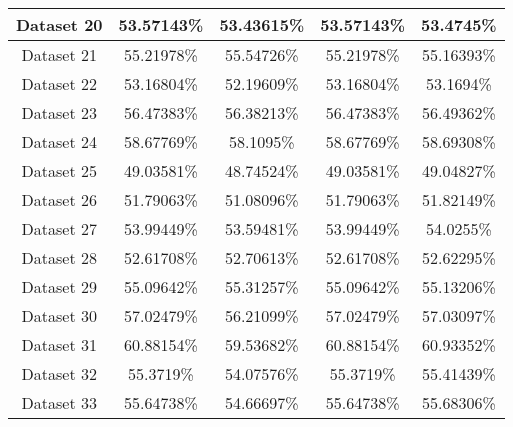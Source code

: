 \begin{center}
\begin{tabular}{ |c||c|c|c|c| }
    \hline
    Dataset 20& 53.57143\%& 53.43615\%& 53.57143\%& 53.4745\%\\
    \hline
    Dataset 21& 55.21978\%& 55.54726\%& 55.21978\%& 55.16393\%\\
    \hline
    Dataset 22& 53.16804\%& 52.19609\%& 53.16804\%& 53.1694\%\\
    \hline
    Dataset 23& 56.47383\%& 56.38213\%& 56.47383\%& 56.49362\%\\
    \hline
    Dataset 24& 58.67769\%& 58.1095\%& 58.67769\%& 58.69308\%\\
    \hline
    Dataset 25& 49.03581\%& 48.74524\%& 49.03581\%& 49.04827\%\\
    \hline
    Dataset 26& 51.79063\%& 51.08096\%& 51.79063\%& 51.82149\%\\
    \hline
    Dataset 27& 53.99449\%& 53.59481\%& 53.99449\%& 54.0255\%\\
    \hline
    Dataset 28& 52.61708\%& 52.70613\%& 52.61708\%& 52.62295\%\\
    \hline
    Dataset 29& 55.09642\%& 55.31257\%& 55.09642\%& 55.13206\%\\
    \hline
    Dataset 30& 57.02479\%& 56.21099\%& 57.02479\%& 57.03097\%\\
    \hline
    Dataset 31& 60.88154\%& 59.53682\%& 60.88154\%& 60.93352\%\\
    \hline
    Dataset 32& 55.3719\%& 54.07576\%& 55.3719\%& 55.41439\%\\
    \hline
    Dataset 33& 55.64738\%& 54.66697\%& 55.64738\%& 55.68306\%\\
    \hline
\end{tabular}
\end{center}
